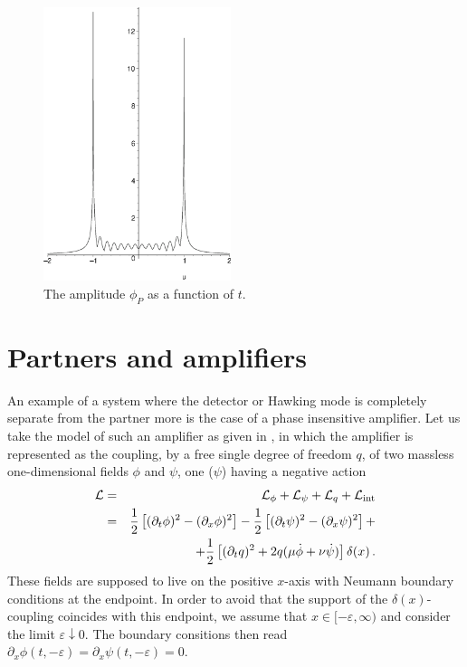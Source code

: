 \documentclass[aps,prd,showpacs,amssymb,nofootinbib,twocolumn]{revtex4}
\newcommand{\nn}{\nonumber\\}
\newcommand{\bea}{\begin{eqnarray}}
\newcommand{\eea}{\end{eqnarray}}
\begin{document}
\begin{figure}[ht]
\includegraphics[height=8cm]{fig2.eps}
\caption{\label{figure2} The amplitude $\phi_P$ as a function of $t$.}
\end{figure}


\section{Partners and amplifiers}\label{Partners and amplifiers}

An example of a system where the detector or Hawking mode is completely 
separate from the partner more is the case of a phase insensitive amplifier. 
%
Let us take the model of such an amplifier as given in \cite{amplify}, 
in which the amplifier is represented as the coupling, by a free single 
degree of freedom $q$, of two massless one-dimensional fields $\phi$ and 
$\psi$, one ($\psi$) having a negative action
%
\bea
{\cal L}
&=&
{\cal L}_\phi+{\cal L}_\psi+{\cal L}_q+{\cal L}_{\rm int}
\nn
&=&
\frac12\left[(\partial_t\phi)^2-(\partial_x\phi)^2 \right] 
-\frac12\left[(\partial_t\psi)^2-(\partial_x\psi)^2 \right]+ 
\nn
&&
+\frac12\left[(\partial_t q)^2
+2q(\mu\dot\phi+\nu\dot\psi)
\right]\delta(x)
\,.
\eea
%
These fields are supposed to live on the positive $x$-axis with Neumann 
boundary conditions at the endpoint.
%
In order to avoid that the support of the $\delta(x)$-coupling coincides 
with this endpoint, we assume that $x\in[-\varepsilon,\infty)$ and consider 
the limit $\varepsilon\downarrow0$.
%
The boundary consitions then read 
$\partial_x\phi(t,-\varepsilon)=\partial_x\psi(t,-\varepsilon)=0$. 
\end{document}
